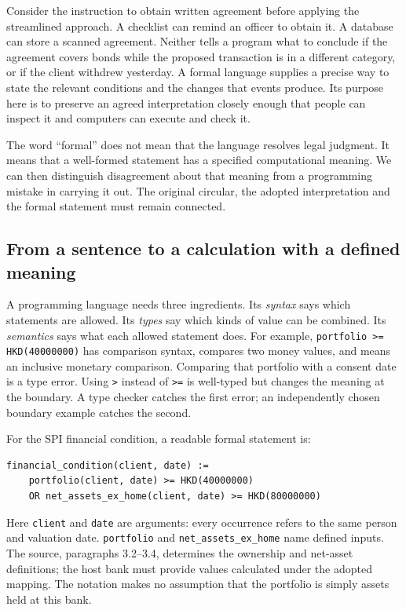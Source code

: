 \documentclass[12pt,a4paper,oneside,openany]{book}
\begin{document}
\label{sec:language-lesson}

Consider the instruction to obtain written agreement before applying the
streamlined approach. A checklist can remind an officer to obtain it. A database
can store a scanned agreement. Neither tells a program what to conclude if the
agreement covers bonds while the proposed transaction is in a different category,
or if the client withdrew yesterday. A formal language supplies a precise way
to state the relevant conditions and the changes that events produce. Its
purpose here is to preserve an agreed interpretation closely enough that people
can inspect it and computers can execute and check it.

The word ``formal'' does not mean that the language resolves legal judgment.
It means that a well-formed statement has a specified computational meaning.
We can then distinguish disagreement about that meaning from a programming
mistake in carrying it out. The original circular, the adopted interpretation
and the formal statement must remain connected.

\subsection{From a sentence to a calculation with a defined meaning}
\label{merge:P-01a-language-lesson:01}


A programming language needs three ingredients. Its \emph{syntax} says which
statements are allowed. Its \emph{types} say which kinds of value can be combined.
Its \emph{semantics} says what each allowed statement does. For example,
\texttt{portfolio >= HKD(40000000)} has comparison syntax, compares two money
values, and means an inclusive monetary comparison. Comparing that portfolio
with a consent date is a type error. Using \texttt{>} instead of \texttt{>=} is
well-typed but changes the meaning at the boundary. A type checker catches the
first error; an independently chosen boundary example catches the second.

For the SPI financial condition, a readable formal statement is:
\begin{lstlisting}[caption={Illustrative controlled syntax for Annex 1 paragraph 3.1. This is a teaching notation, not Catala or Stipula source.}]
financial_condition(client, date) :=
    portfolio(client, date) >= HKD(40000000)
    OR net_assets_ex_home(client, date) >= HKD(80000000)
\end{lstlisting}
Here \texttt{client} and \texttt{date} are arguments: every occurrence refers to
the same person and valuation date. \texttt{portfolio} and
\texttt{net\_assets\_ex\_home} name defined inputs. The source, paragraphs
3.2--3.4, determines the ownership and net-asset definitions; the host bank must
provide values calculated under the adopted mapping. The notation makes no
assumption that the portfolio is simply assets held at this bank.
\end{document}
